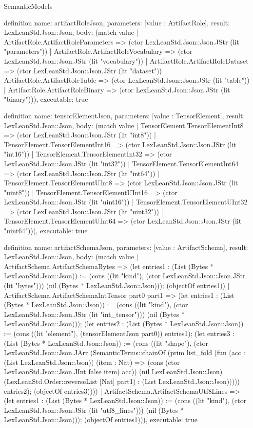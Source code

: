 \begin{lexlean}{SemanticModels}
\begin{semanticmodule}
definition{
  name: artifactRoleJson,
  parameters: [value : ArtifactRole],
  result: LexLeanStd.Json::Json,
  body: (match value
    | ArtifactRole.ArtifactRoleParameters => (ctor LexLeanStd.Json::Json.JStr (lit "parameters"))
    | ArtifactRole.ArtifactRoleVocabulary => (ctor LexLeanStd.Json::Json.JStr (lit "vocabulary"))
    | ArtifactRole.ArtifactRoleDataset => (ctor LexLeanStd.Json::Json.JStr (lit "dataset"))
    | ArtifactRole.ArtifactRoleTable => (ctor LexLeanStd.Json::Json.JStr (lit "table"))
    | ArtifactRole.ArtifactRoleBinary => (ctor LexLeanStd.Json::Json.JStr (lit "binary"))),
  executable: true
}

definition{
  name: tensorElementJson,
  parameters: [value : TensorElement],
  result: LexLeanStd.Json::Json,
  body: (match value
    | TensorElement.TensorElementInt8 => (ctor LexLeanStd.Json::Json.JStr (lit "int8"))
    | TensorElement.TensorElementInt16 => (ctor LexLeanStd.Json::Json.JStr (lit "int16"))
    | TensorElement.TensorElementInt32 => (ctor LexLeanStd.Json::Json.JStr (lit "int32"))
    | TensorElement.TensorElementInt64 => (ctor LexLeanStd.Json::Json.JStr (lit "int64"))
    | TensorElement.TensorElementUInt8 => (ctor LexLeanStd.Json::Json.JStr (lit "uint8"))
    | TensorElement.TensorElementUInt16 => (ctor LexLeanStd.Json::Json.JStr (lit "uint16"))
    | TensorElement.TensorElementUInt32 => (ctor LexLeanStd.Json::Json.JStr (lit "uint32"))
    | TensorElement.TensorElementUInt64 => (ctor LexLeanStd.Json::Json.JStr (lit "uint64"))),
  executable: true
}

definition{
  name: artifactSchemaJson,
  parameters: [value : ArtifactSchema],
  result: LexLeanStd.Json::Json,
  body: (match value
    | ArtifactSchema.ArtifactSchemaBytes => (let entries1 : (List (Bytes * LexLeanStd.Json::Json)) := (cons ((lit "kind"), (ctor LexLeanStd.Json::Json.JStr (lit "bytes"))) (nil (Bytes * LexLeanStd.Json::Json))); (objectOf entries1))
    | ArtifactSchema.ArtifactSchemaIntTensor part0 part1 => (let entries1 : (List (Bytes * LexLeanStd.Json::Json)) := (cons ((lit "kind"), (ctor LexLeanStd.Json::Json.JStr (lit "int_tensor"))) (nil (Bytes * LexLeanStd.Json::Json))); (let entries2 : (List (Bytes * LexLeanStd.Json::Json)) := (cons ((lit "element"), (tensorElementJson part0)) entries1); (let entries3 : (List (Bytes * LexLeanStd.Json::Json)) := (cons ((lit "shape"), (ctor LexLeanStd.Json::Json.JArr (SemanticTerms::chainOf (prim list_fold (fun (acc : (List LexLeanStd.Json::Json)) (item : Nat) => (cons (ctor LexLeanStd.Json::Json.JInt false item) acc)) (nil LexLeanStd.Json::Json) (LexLeanStd.Order::reverseList [Nat] part1) : (List LexLeanStd.Json::Json))))) entries2); (objectOf entries3))))
    | ArtifactSchema.ArtifactSchemaUtf8Lines => (let entries1 : (List (Bytes * LexLeanStd.Json::Json)) := (cons ((lit "kind"), (ctor LexLeanStd.Json::Json.JStr (lit "utf8_lines"))) (nil (Bytes * LexLeanStd.Json::Json))); (objectOf entries1))),
  executable: true
}


\end{semanticmodule}
\end{lexlean}
